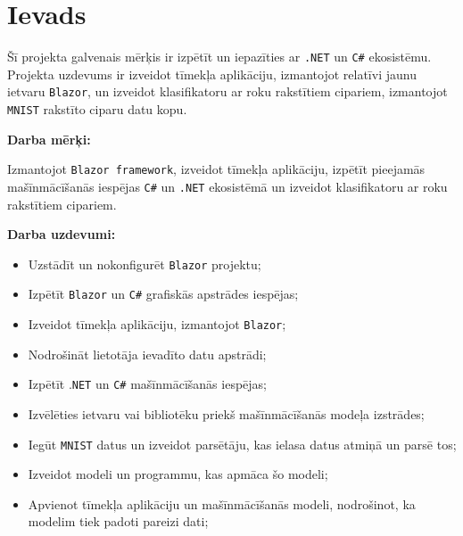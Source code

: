 \section{Ievads}

    Šī projekta galvenais mērķis ir izpētīt un iepazīties
    ar \texttt{.NET} un \texttt{C\#} ekosistēmu. Projekta uzdevums ir izveidot tīmekļa aplikāciju, izmantojot relatīvi
    jaunu ietvaru \texttt{Blazor}, un izveidot klasifikatoru ar roku rakstītiem cipariem, izmantojot
    \texttt{MNIST} \cite{MNISTHandwrittenDigit} rakstīto ciparu datu kopu.

    \textbf{Darba mērķi:}

    Izmantojot \texttt{Blazor framework}, izveidot tīmekļa aplikāciju, izpētīt pieejamās mašīnmācīšanās
    iespējas \texttt{C\#} un \texttt{.NET} ekosistēmā un izveidot klasifikatoru ar roku rakstītiem cipariem.

    \textbf{Darba uzdevumi:}

    \begin{itemize}
        \item Uzstādīt un nokonfigurēt \texttt{Blazor} projektu;
        \item Izpētīt \texttt{Blazor} un \texttt{C\#} grafiskās apstrādes iespējas;
        \item Izveidot tīmekļa aplikāciju, izmantojot \texttt{Blazor};
        \item Nodrošināt lietotāja ievadīto datu apstrādi;
        \item Izpētīt .\texttt{NET} un \texttt{C\#} mašīnmācīšanās iespējas;
        \item Izvēlēties ietvaru vai bibliotēku priekš mašīnmācīšanās modeļa izstrādes;
        \item Iegūt \texttt{MNIST} datus un izveidot parsētāju, kas ielasa datus atmiņā un parsē tos;
        \item Izveidot modeli un programmu, kas apmāca šo modeli;
        \item Apvienot tīmekļa aplikāciju un mašīnmācīšanās modeli, nodrošinot, ka modelim tiek padoti pareizi dati;
    \end{itemize}

